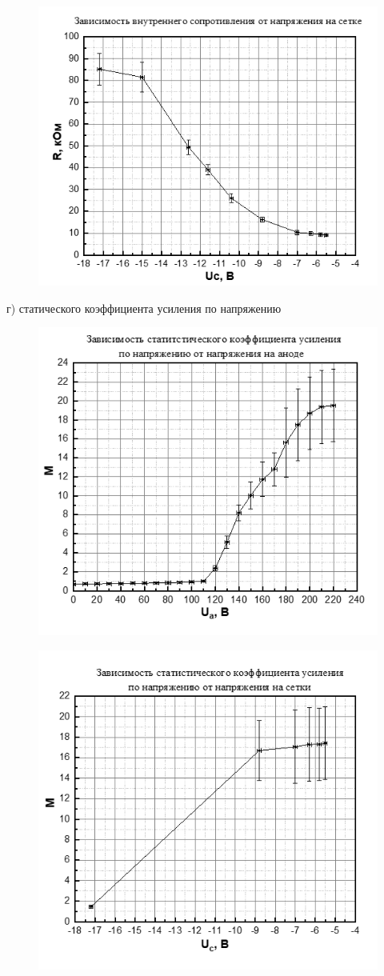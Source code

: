 \begin{figure}[H]
	\centering
	\includegraphics[width=0.7\linewidth]{fig/img22.png}
	\caption{}
	\label{fig:10}
\end{figure}

г) статического коэффициента усиления по напряжению
\begin{figure}[h!]
	\centering
	\includegraphics[width=0.65\linewidth]{fig/img31.png}
	\caption{}
	\label{fig:10}
\end{figure}

\begin{figure}[H]
	\centering
	\includegraphics[width=0.7\linewidth]{fig/img32.png}
	\caption{}
	\label{fig:10}
\end{figure}


